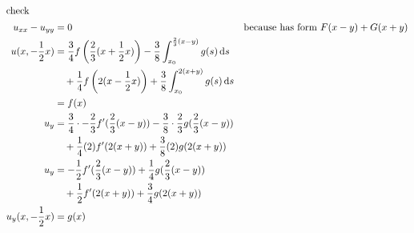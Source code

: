 \documentclass{article}
\begin{document}
\begin{align*}
  \intertext{check}
  u_{xx}-u_{yy}&=0&\text{because has form }F(x-y)+G(x+y)\\
  u(x,-\frac{1}{2}x)
  &=\frac{3}{4}f\left(\frac{2}{3}(x+\frac{1}{2}x)\right)-\frac{3}{8}\int_{x_0}^{\frac{2}{3}(x-y)}{g(s)\,\mathrm{d}s}\\
  &\quad+\frac{1}{4}f\left(2(x-\frac{1}{2}x)\right)+\frac{3}{8}\int_{x_0}^{2(x+y)}{g(s)\,\mathrm{d}s}\\
  &=f(x)\\
  u_y&=\frac{3}{4}\cdot-\frac{2}{3}f'(\frac{2}{3}(x-y))-\frac{3}{8}\cdot\frac{2}{3}g(\frac{2}{3}(x-y))\\
  &\quad+\frac{1}{4}(2)f'(2(x+y))+\frac{3}{8}(2)g(2(x+y))\\
  u_y&=-\frac{1}{2}f'(\frac{2}{3}(x-y))+\frac{1}{4}g(\frac{2}{3}(x-y))\\
  &\quad+\frac{1}{2}f'(2(x+y))+\frac{3}{4}g(2(x+y))\\
  u_y(x,-\frac{1}{2}x)&=g(x)
\end{align*}
\end{document}
